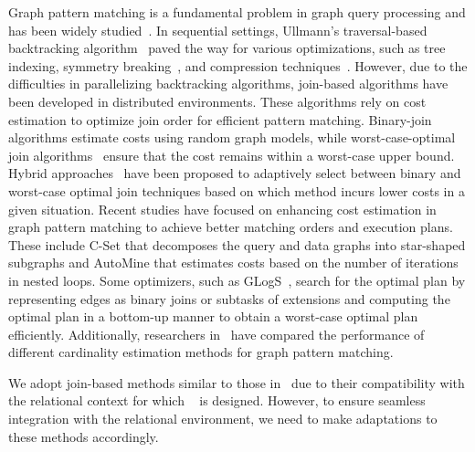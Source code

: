  Graph pattern matching is a fundamental problem in graph query processing and has been widely studied~\cite{angles2017foundations}. In sequential settings, Ullmann's traversal-based backtracking algorithm~\cite{ullmann1976algorithm} paved the way for various optimizations, such as tree indexing\cite{shang2008quicksi}, symmetry breaking~\cite{han13turbo}, and compression techniques~\cite{bi2016efficient}. However, due to the difficulties in parallelizing backtracking algorithms, join-based algorithms have been developed in distributed environments. These algorithms rely on cost estimation to optimize join order for efficient pattern matching. Binary-join algorithms\cite{lai2015scalable, lai2019distributed} estimate costs using random graph models, while worst-case-optimal join algorithms~\cite{ammar2018distributed} ensure that the cost remains within a worst-case upper bound. Hybrid approaches~\cite{mhedhbi2019optimizing, huge} have been proposed to adaptively select between binary and worst-case optimal join techniques based on which method incurs lower costs in a given situation. Recent studies have focused on enhancing cost estimation in graph pattern matching to achieve better matching orders and execution plans. These include C-Set \cite{cset} that decomposes the query and data graphs into star-shaped subgraphs and AutoMine \cite{AutoMine} that estimates costs based on the number of iterations in nested loops. Some optimizers, such as GLogS~\cite{GLogS}, search for the optimal plan by representing edges as binary joins or subtasks of extensions and computing the optimal plan in a bottom-up manner to obtain a worst-case optimal plan efficiently. Additionally, researchers in~\cite{gcare} have compared the performance of different cardinality estimation methods for graph pattern matching.

We adopt join-based methods similar to those in~\cite{huge,GLogS} due to their compatibility with the relational context for which \name~ is designed. However, to ensure seamless integration with the relational environment, we need to make adaptations to these methods accordingly.


